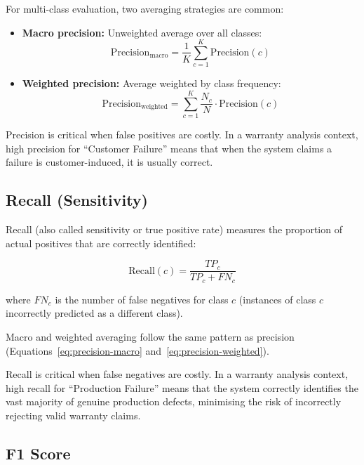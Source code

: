 \documentclass[10pt,a4paper]{article}
\begin{document}
For multi-class evaluation, two averaging strategies are common:

\begin{itemize}
    \item \textbf{Macro precision:} Unweighted average over all classes:
    \begin{equation}
    \text{Precision}_{\text{macro}} = \frac{1}{K} \sum_{c=1}^{K} \text{Precision}(c)
    \label{eq:precision-macro}
    \end{equation}
    \item \textbf{Weighted precision:} Average weighted by class frequency:
    \begin{equation}
    \text{Precision}_{\text{weighted}} = \sum_{c=1}^{K} \frac{N_c}{N} \cdot \text{Precision}(c)
    \label{eq:precision-weighted}
    \end{equation}
\end{itemize}

Precision is critical when false positives are costly. In a warranty analysis context, high precision for ``Customer Failure'' means that when the system claims a failure is customer-induced, it is usually correct.

\subsection{Recall (Sensitivity)}
\label{sec:recall}

Recall (also called sensitivity or true positive rate) measures the proportion of actual positives that are correctly identified:

\begin{equation}
\text{Recall}(c) = \frac{TP_c}{TP_c + FN_c}
\label{eq:recall}
\end{equation}

where $FN_c$ is the number of false negatives for class $c$ (instances of class $c$ incorrectly predicted as a different class).

Macro and weighted averaging follow the same pattern as precision (Equations~\ref{eq:precision-macro} and~\ref{eq:precision-weighted}).

Recall is critical when false negatives are costly. In a warranty analysis context, high recall for ``Production Failure'' means that the system correctly identifies the vast majority of genuine production defects, minimising the risk of incorrectly rejecting valid warranty claims.

\subsection{F1 Score}
\label{sec:f1-score}
\end{document}
